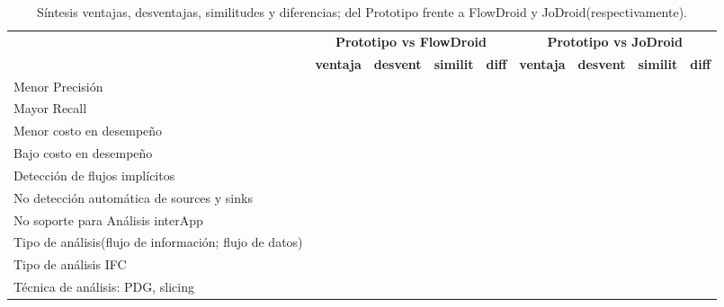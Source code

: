 \begin{table}[H]
\small\addtolength{\tabcolsep}{-3pt}
\begin{tabular}{|p{4cm}|p{1cm}|p{1cm}|p{1cm}|p{1cm}|p{1cm}|p{1cm}|p{1cm}|p{1cm}|}
	\hline
	{\multirow{2}{*}{\textbf{Item}}}
	&\multicolumn{4}{c|}{\cellcolor{gray!30}\textbf{Prototipo vs FlowDroid}} &
	\multicolumn{4}{c|}{\cellcolor{gray!55}\textbf{Prototipo vs JoDroid}}\\
	\cline{2-9}
	 & \cellcolor{gray!30}\tiny{\textbf{ventaja}} &
	 \cellcolor{gray!30}\tiny{\textbf{desvent}} &
	 \cellcolor{gray!30}\tiny{\textbf{similit}}&
	 \cellcolor{gray!30}\tiny{\textbf{diff}} &
	 \cellcolor{gray!55}\tiny{\textbf{ventaja}} &
	 \cellcolor{gray!55}\tiny{\textbf{desvent}} &
	 \cellcolor{gray!55}\tiny{\textbf{similit}}&
	 \cellcolor{gray!55}\tiny{\textbf{diff}}\\
	\hline
	\footnotesize{Menor Precisión} & &\checkmark & & & &\checkmark& &\\
	\hline
	Mayor Recall &\checkmark& & & &\checkmark& & &\\
	\hline
	Menor costo en desempeño & & & & &\checkmark& & &\\
	\hline
	Bajo costo en desempeño & & &\checkmark& & & & & \\
	\hline
	Detección de flujos implícitos & \checkmark& & & & & &\checkmark&\\
	\hline
	No detección automática de sources y sinks & &\checkmark&& &&&\checkmark& \\
	\hline
	No soporte para Análisis interApp & &\checkmark& & & & &\checkmark&\\
	\hline
	\footnotesize{Tipo de análisis(flujo de información; flujo de datos)} & & &
	&\checkmark& & & &\\
	\hline
	Tipo de análisis IFC & & & & & & &\checkmark&\\
	\hline
	Técnica de análisis: PDG, slicing & & & & & & & &\checkmark\\
	\hline
\end{tabular}
\caption{Síntesis ventajas, desventajas, similitudes y diferencias; del
Prototipo frente a FlowDroid y JoDroid(respectivamente).\newline}
\label{tab:resumen}
\end{table}

